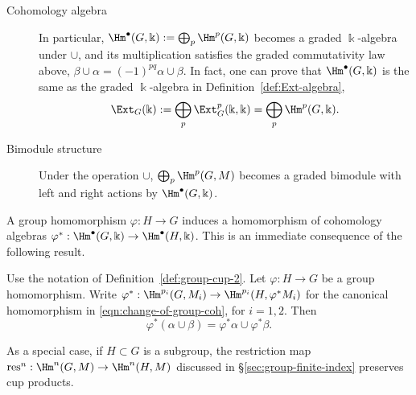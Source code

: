 \begin{description}
	\item[Cohomology algebra] In particular,
	$\Hm^\bullet(G,\Bbbk):=\bigoplus_p\Hm^p(G,\Bbbk)$ becomes a graded
	$\Bbbk$-algebra under $\cup$, and its multiplication satisfies the graded
	commutativity law above,
	$\beta\cup\alpha=(-1)^{pq}\alpha\cup\beta$. In fact, one can prove that
	$\Hm^\bullet(G,\Bbbk)$ is the same as the graded $\Bbbk$-algebra in
	Definition~\ref{def:Ext-algebra},
	\[ \Ext_G(\Bbbk) := \bigoplus_p \Ext^p_G(\Bbbk, \Bbbk) = \bigoplus_p \Hm^p(G, \Bbbk). \]

	\item[Bimodule structure]
	Under the operation $\cup$, $\bigoplus_p\Hm^p(G,M)$ becomes a graded
	bimodule with left and right actions by $\Hm^\bullet(G,\Bbbk)$.
\end{description}

A group homomorphism $\varphi:H\to G$ induces a homomorphism of cohomology
algebras $\varphi^*:\Hm^\bullet(G,\Bbbk)\to\Hm^\bullet(H,\Bbbk)$. This is an
immediate consequence of the following result.

\begin{proposition}
	Use the notation of Definition~\ref{def:group-cup-2}. Let
	$\varphi:H\to G$ be a group homomorphism. Write
	$\varphi^*:\Hm^{p_i}(G,M_i)\to\Hm^{p_i}(H,\varphi^*M_i)$ for the
	canonical homomorphism in \eqref{eqn:change-of-group-coh}, for $i=1,2$.
	Then
	\[ \varphi^*(\alpha \cup \beta) = \varphi^* \alpha \cup \varphi^* \beta. \]

	As a special case, if $H\subset G$ is a subgroup, the restriction map
	$\mathrm{res}^n:\Hm^n(G,M)\to\Hm^n(H,M)$ discussed in
	\S\ref{sec:group-finite-index} preserves cup products.
\end{proposition}

